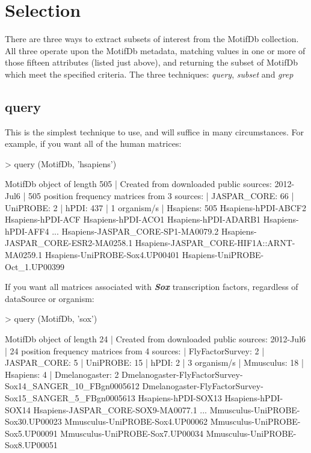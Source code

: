 \documentclass{article}
\renewenvironment{Schunk}{\vspace{\topsep}}{\vspace{\topsep}}
\begin{document}
\section{Selection}

There are three ways to extract subsets of interest from the MotifDb collection.  All three operate upon the MotifDb metadata,
matching values in one or more of those fifteen attributes (listed just above), and returning the subset of MotifDb  which 
meet the specified criteria.  The three techniques:  \emph{query}, \emph{subset} and \emph{grep}

\subsection{query}
This is the simplest technique to use, and will suffice in many circumstances.  For example, if you want 
all of the human matrices:
\begin{Schunk}
\begin{Sinput}
> query (MotifDb, 'hsapiens')
\end{Sinput}
\begin{Soutput}
MotifDb object of length 505
| Created from downloaded public sources: 2012-Jul6
| 505 position frequency matrices from 3 sources:
|        JASPAR_CORE:   66
|           UniPROBE:    2
|               hPDI:  437
| 1 organism/s
|           Hsapiens:  505
Hsapiens-hPDI-ABCF2 
Hsapiens-hPDI-ACF 
Hsapiens-hPDI-ACO1 
Hsapiens-hPDI-ADARB1 
Hsapiens-hPDI-AFF4 
...
Hsapiens-JASPAR_CORE-SP1-MA0079.2 
Hsapiens-JASPAR_CORE-ESR2-MA0258.1 
Hsapiens-JASPAR_CORE-HIF1A::ARNT-MA0259.1 
Hsapiens-UniPROBE-Sox4.UP00401 
Hsapiens-UniPROBE-Oct_1.UP00399 
\end{Soutput}
\end{Schunk}
If you want all matrices associated with \textbf{\emph{Sox}} transcription factors, regardless of dataSource or organism:
\begin{Schunk}
\begin{Sinput}
> query (MotifDb, 'sox')
\end{Sinput}
\begin{Soutput}
MotifDb object of length 24
| Created from downloaded public sources: 2012-Jul6
| 24 position frequency matrices from 4 sources:
|    FlyFactorSurvey:    2
|        JASPAR_CORE:    5
|           UniPROBE:   15
|               hPDI:    2
| 3 organism/s
|          Mmusculus:   18
|           Hsapiens:    4
|      Dmelanogaster:    2
Dmelanogaster-FlyFactorSurvey-Sox14_SANGER_10_FBgn0005612 
Dmelanogaster-FlyFactorSurvey-Sox15_SANGER_5_FBgn0005613 
Hsapiens-hPDI-SOX13 
Hsapiens-hPDI-SOX14 
Hsapiens-JASPAR_CORE-SOX9-MA0077.1 
...
Mmusculus-UniPROBE-Sox30.UP00023 
Mmusculus-UniPROBE-Sox4.UP00062 
Mmusculus-UniPROBE-Sox5.UP00091 
Mmusculus-UniPROBE-Sox7.UP00034 
Mmusculus-UniPROBE-Sox8.UP00051 
\end{Soutput}
\end{Schunk}
\end{document}
